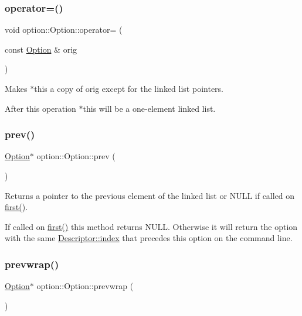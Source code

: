 \subsubsection{\texorpdfstring{operator=()}{operator=()}}
{\footnotesize\ttfamily void option\+::\+Option\+::operator= (\begin{DoxyParamCaption}\item[{const \hyperlink{classoption_1_1_option}{Option} \&}]{orig }\end{DoxyParamCaption})\hspace{0.3cm}{\ttfamily [inline]}}



Makes {\ttfamily $\ast$this} a copy of {\ttfamily orig} except for the linked list pointers. 

After this operation {\ttfamily $\ast$this} will be a one-\/element linked list. \mbox{\label{classoption_1_1_option_a4d12001a91b0b35cf47437d0c60d2b52}} 
\subsubsection{\texorpdfstring{prev()}{prev()}}
{\footnotesize\ttfamily \hyperlink{classoption_1_1_option}{Option}$\ast$ option\+::\+Option\+::prev (\begin{DoxyParamCaption}{ }\end{DoxyParamCaption})\hspace{0.3cm}{\ttfamily [inline]}}



Returns a pointer to the previous element of the linked list or N\+U\+LL if called on \hyperlink{classoption_1_1_option_abb4e13cd7c90999c8a6b1f871cece283}{first()}. 

If called on \hyperlink{classoption_1_1_option_abb4e13cd7c90999c8a6b1f871cece283}{first()} this method returns N\+U\+LL. Otherwise it will return the option with the same \hyperlink{structoption_1_1_descriptor_a1fee8ac44f529c99ac2b1149b4c391b1}{Descriptor\+::index} that precedes this option on the command line. \mbox{\label{classoption_1_1_option_a1226e45dc2de30f269b2aff1784bbee7}} 
\subsubsection{\texorpdfstring{prevwrap()}{prevwrap()}\hspace{0.1cm}{\footnotesize\ttfamily [1/2]}}
{\footnotesize\ttfamily \hyperlink{classoption_1_1_option}{Option}$\ast$ option\+::\+Option\+::prevwrap (\begin{DoxyParamCaption}{ }\end{DoxyParamCaption})\hspace{0.3cm}{\ttfamily [inline]}}



